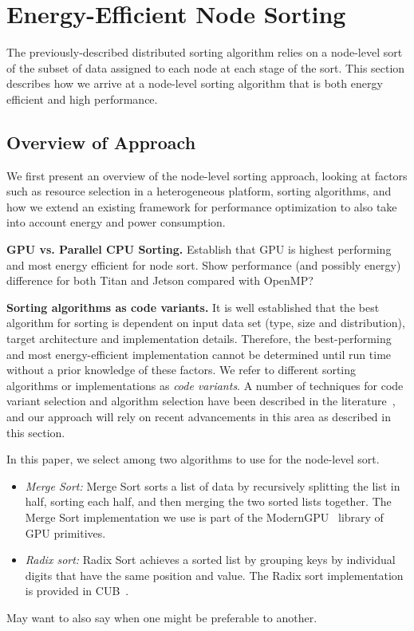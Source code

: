 \section{Energy-Efficient Node Sorting}
The previously-described distributed sorting algorithm relies
on a node-level sort of the subset of data assigned to each node at 
each stage of the sort.  This section describes how we arrive 
at a node-level sorting algorithm that is both energy efficient and
high performance.  

\subsection{Overview of Approach}
We first present an overview of the node-level sorting approach, 
looking at factors such as resource selection in a heterogeneous platform, 
sorting algorithms, and how we extend an existing framework for performance
optimization to also take into account energy and power consumption.

\noindent
{\bf GPU vs. Parallel CPU Sorting.}
{\color{red}Establish that GPU is highest performing and most energy efficient for node sort.
Show performance (and possibly energy) 
difference for both Titan and Jetson compared with OpenMP?}  

\vspace*{.1in}

\noindent
{\bf Sorting algorithms as code variants.}
It is well established that the best algorithm for sorting
is dependent on input data set (type, size and distribution), target 
architecture and implementation details.   Therefore, the best-performing
and most energy-efficient implementation cannot
be determined until run time without a prior knowledge of these factors.
We refer to different sorting algorithms or implementations
as \emph{code variants}.  
A number of techniques for code variant selection and algorithm
selection have been described in the literature~\cite{algsel}, and our approach
will rely on recent advancements in this area as described in this section.
 
In this paper, we select among two algorithms to use for
the node-level sort.  
\begin{itemize}
\item \emph{Merge Sort:}
Merge Sort sorts a list of data by 
recursively splitting the list in half, sorting each half,
and then merging the two sorted lists together.
The Merge Sort implementation we use is
part of the ModernGPU~\cite{modernGPU} library of GPU
primitives.  
\item \emph{Radix sort:}
Radix Sort achieves a sorted list by grouping keys by individual digits  
that have the same position and value.
The Radix sort implementation is provided in CUB~\cite{cub}. 
\end{itemize}
{\color{red} May want to also say when one might be preferable to another.}

